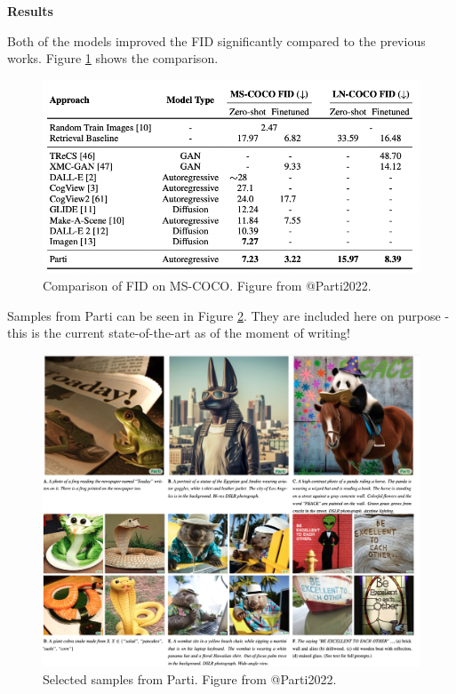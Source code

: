 \documentclass[
]{krantz}
\begin{document}
\textbf{Results}

Both of the models improved the FID significantly compared to the previous works. Figure \ref{fig:partiresults} shows the comparison.

\begin{figure}

{\centering \includegraphics[width=0.8\linewidth]{figures/02-02-text-2-img/partiresults} 

}

\caption{Comparison of FID on MS-COCO. Figure from @Parti2022.}\label{fig:partiresults}
\end{figure}

Samples from Parti can be seen in Figure \ref{fig:partiimages}. They are included here on purpose - this is the current state-of-the-art as of the moment of writing!

\begin{figure}

{\centering \includegraphics[width=1\linewidth]{figures/02-02-text-2-img/partiimages} 

}

\caption{Selected samples from Parti. Figure from @Parti2022.}\label{fig:partiimages}
\end{figure}
\end{document}
